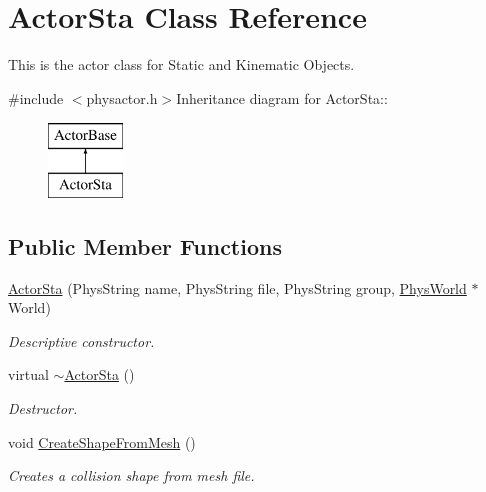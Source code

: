 \hypertarget{classActorSta}{
\section{ActorSta Class Reference}
\label{d3/daf/classActorSta}
}


This is the actor class for Static and Kinematic Objects.  


{\ttfamily \#include $<$physactor.h$>$}Inheritance diagram for ActorSta::\begin{figure}[H]
\begin{center}
\leavevmode
\includegraphics[height=2cm]{d3/daf/classActorSta}
\end{center}
\end{figure}
\subsection*{Public Member Functions}
\begin{DoxyCompactItemize}
\item 
\hyperlink{classActorSta_a00185fe588416c236f491b65f16dd145}{ActorSta} (PhysString name, PhysString file, PhysString group, \hyperlink{classPhysWorld}{PhysWorld} $\ast$World)
\begin{DoxyCompactList}\small\item\em Descriptive constructor. \item\end{DoxyCompactList}\item 
virtual \hyperlink{classActorSta_a5da54cd102413f920df2dae3555fead2}{$\sim$ActorSta} ()
\begin{DoxyCompactList}\small\item\em Destructor. \item\end{DoxyCompactList}\item 
void \hyperlink{classActorSta_a12e78aa21e50e6964330e25affa421c9}{CreateShapeFromMesh} ()
\begin{DoxyCompactList}\small\item\em Creates a collision shape from mesh file. \item\end{DoxyCompactList}\end{DoxyCompactItemize}
